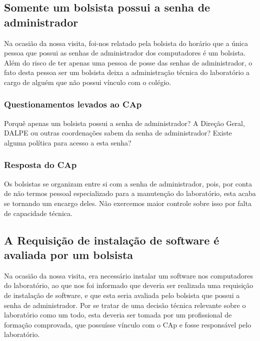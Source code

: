 \subsection{Somente um bolsista possui a senha de administrador}\label{sec:LABEL_CHP_REL_SEC_PROBS_SUBSEC_PSWD}

Na ocasião da nossa visita, foi-nos relatado pela bolsista do horário que a única pessoa que possui as senhas de administrador dos computadores é um bolsista. Além do risco de ter apenas uma pessoa de posse das senhas de administrador, o fato desta pessoa ser um bolsista deixa a administração técnica do laboratório a cargo de alguém que não possui vínculo com o colégio.

\subsubsection{Questionamentos levados ao CAp}

Porquê apenas um bolsista possui a senha de administrador? A Direção Geral, DALPE ou outras coordenações sabem da senha de administrador? Existe alguma política para acesso a esta senha?

\subsubsection{Resposta do CAp}

Os bolsistas se organizam entre si com a senha de administrador, pois, por conta de não termos pessoal especializado para a manutenção do laboratório, esta acaba se tornando um encargo deles. Não exercemos maior controle sobre isso por falta de capacidade técnica.

\subsection{A Requisição de instalação de software é avaliada por um bolsista}\label{sec:LABEL_CHP_REL_SEC_PROBS_SUBSEC_REQ_INST}

Na ocasião da nossa visita, era necessário instalar um software nos computadores do laboratório, ao que nos foi informado que deveria ser realizada uma requisição de instalação de software, e que esta seria avaliada pelo bolsista que possui a senha de administrador. Por se tratar de uma decisão técnica relevante sobre o laboratório como um todo, esta deveria ser tomada por um profissional de formação comprovada, que possuísse vínculo com o CAp e fosse responsável pelo laboratório.

